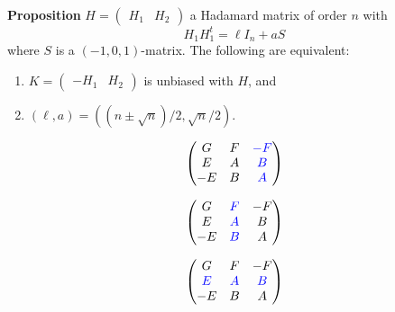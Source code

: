 \documentclass{beamer}
\newcommand{\bblue}[1]{\textcolor{blue}{#1}}
\begin{document}
\begin{frame}

  \begin{block}{{\bf Proposition} \cite[][]{splittable-hadamard}}
    $H = \left( \begin{smallmatrix} H_1 & H_2 \end{smallmatrix} \right)$ a
    Hadamard matrix of order $n$ with
    \[
      H_1H_1^t = \ell I_n + aS
    \]
    where $S$ is a $(-1,0,1)$-matrix. The following are equivalent:
    \begin{enumerate}
      \item $K = \left( \begin{smallmatrix} -H_1 & H_2 \end{smallmatrix}
        \right)$ is unbiased with $H$, and
      \item $(\ell,a) = ((n \pm \sqrt{n})/2,\sqrt{n}/2)$.
    \end{enumerate}
  \end{block}
  
\end{frame}

\begin{frame}

  \[
    \begin{pmatrix}
      G & F & \bblue{-F} \\
      E & A & \bblue{B} \\
      -E & B & \bblue{A}
    \end{pmatrix}
  \]
  
\end{frame}

\begin{frame}

  \[
    \begin{pmatrix}
      G & \bblue{F} & -F \\
      E & \bblue{A} & B \\
      -E & \bblue{B} & A
    \end{pmatrix}
  \]
  
\end{frame}

\begin{frame}

  \[
    \begin{pmatrix}
      G & F & -F \\
      \bblue{E} & \bblue{A} & \bblue{B} \\
      -E & B & A
    \end{pmatrix}
  \]
  
\end{frame}
\end{document}
